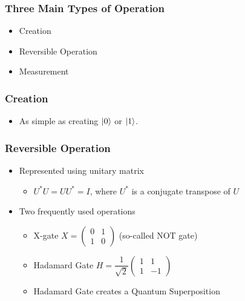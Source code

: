 \documentclass{beamer}
\begin{document}
    \begin{frame}
        \frametitle{Three Main Types of Operation}
        \begin{itemize}
            \item Creation
            \item Reversible Operation
            \item Measurement
        \end{itemize}
    \end{frame}

    \begin{frame}
        \frametitle{Creation}
        \begin{itemize}
            \item As simple as creating $\ket{0}$ or $\ket{1}$.
        \end{itemize}
    \end{frame}

    \begin{frame}
        \frametitle{Reversible Operation}
        \begin{itemize}
            \item Represented using unitary matrix
            \begin{itemize}
                \item $U^*U=UU^*=I$, where $U^*$ is a conjugate transpose of $U$
            \end{itemize}
            \item Two frequently used operations
            \begin{itemize}
                \item X-gate $X=\begin{pmatrix} 0 & 1 \\ 1 & 0 \end{pmatrix}$ (so-called NOT gate)
                \item Hadamard Gate $H=\dfrac{1}{\sqrt{2}}\begin{pmatrix} 1 & 1 \\ 1 & -1 \end{pmatrix}$
                \item Hadamard Gate creates a Quantum Superposition
            \end{itemize}
        \end{itemize}
    \end{frame}
\end{document}
